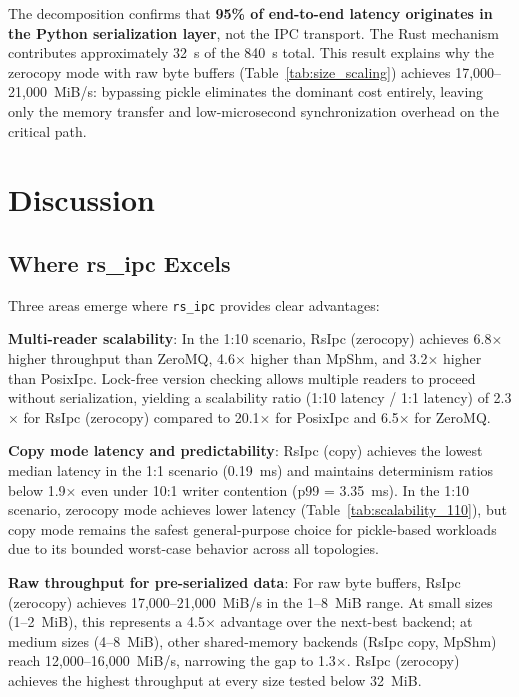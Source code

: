 The decomposition confirms that \textbf{95\% of end-to-end latency originates in the Python serialization layer}, not the IPC transport. The Rust mechanism contributes approximately 32~\textmu s of the 840~\textmu s total. This result explains why the zerocopy mode with raw byte buffers (Table~\ref{tab:size_scaling}) achieves 17,000--21,000~MiB/s: bypassing pickle eliminates the dominant cost entirely, leaving only the memory transfer and low-microsecond synchronization overhead on the critical path.


\newpage
\section{Discussion}
\label{sec:bench_discussion}

\subsection{Where rs\_ipc Excels}

Three areas emerge where \texttt{rs\_ipc} provides clear advantages:

\textbf{Multi-reader scalability}: In the 1:10 scenario, RsIpc (zerocopy) achieves 6.8$\times$ higher throughput than ZeroMQ, 4.6$\times$ higher than MpShm, and 3.2$\times$ higher than PosixIpc. Lock-free version checking allows multiple readers to proceed without serialization, yielding a scalability ratio (1:10 latency / 1:1 latency) of 2.3$\times$ for RsIpc (zerocopy) compared to 20.1$\times$ for PosixIpc and 6.5$\times$ for ZeroMQ.

\textbf{Copy mode latency and predictability}: RsIpc (copy) achieves the lowest median latency in the 1:1 scenario (0.19~ms) and maintains determinism ratios below 1.9$\times$ even under 10:1 writer contention (p99 = 3.35~ms). In the 1:10 scenario, zerocopy mode achieves lower latency (Table~\ref{tab:scalability_110}), but copy mode remains the safest general-purpose choice for pickle-based workloads due to its bounded worst-case behavior across all topologies.

\textbf{Raw throughput for pre-serialized data}: For raw byte buffers, RsIpc (zerocopy) achieves 17,000--21,000~MiB/s in the 1--8~MiB range. At small sizes (1--2~MiB), this represents a 4.5$\times$ advantage over the next-best backend; at medium sizes (4--8~MiB), other shared-memory backends (RsIpc copy, MpShm) reach 12,000--16,000~MiB/s, narrowing the gap to 1.3$\times$. RsIpc (zerocopy) achieves the highest throughput at every size tested below 32~MiB.

